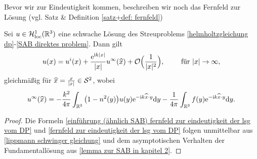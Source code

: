 Bevor wir zur Eindeutigkeit kommen, beschreiben wir noch das Fernfeld zur Lösung (vgl. Satz \& Definition \ref{satz+def: fernfeld})
\begin{satz}\label{satz: wie sieht schwache lsg des direkten streuproblems aus? und fernfeld?}
	Sei \(u\in\mathcal{H}_{\mathrm{loc}}^1(\mathbb{R}^3)\) eine schwache Lösung des Streuproblems \eqref{helmholtzgleichung dp}-\eqref{SAB direktes problem}. Dann gilt
	\begin{equation}
		\label{einführung (ähnlich SAB) fernfeld zur eindeutigkeit der lsg vom DP}
		u(x)=u^i(x)+\frac{\mathrm{e}^{\mathrm{i} k|x|}}{|x|}u^\infty(\widehat{x})+\mathcal{O}\Big(\frac{1}{|x|^2}\Big),\qquad\text{ für }|x|\rightarrow\infty,
	\end{equation}
	gleichmäßig für \(\widehat{x}=\frac{x}{|x|}\in\mathcal{S}^2\), wobei
	\begin{equation}
		\label{fernfeld zur eindeutigkeit der lsg vom DP}
		u^\infty(\widehat{x}) = -\frac{k^2}{4\pi}\int_{\mathbb{R}^3}\big(1-n^2(y)\big)u(y)\mathrm{e}^{-\mathrm{i} k\widehat{x}\cdot y}\mathrm{d}y-\frac{1}{4\pi}\int_{\mathbb{R}^3}f(y)\mathrm{e}^{-\mathrm{i} k\widehat{x}\cdot y}\mathrm{d}y.
	\end{equation}
\end{satz}
\begin{proof}
	Die Formeln \eqref{einführung (ähnlich SAB) fernfeld zur eindeutigkeit der lsg vom DP} und \eqref{fernfeld zur eindeutigkeit der lsg vom DP} folgen unmittelbar aus \eqref{lippmann schwinger gleichung} und dem asymptotischen Verhalten der Fundamentallösung aus \eqref{lemma zur SAB in kapitel 2}.
\end{proof}

